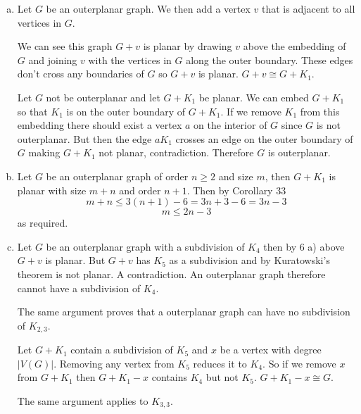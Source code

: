 \begin{enumerate}[(a)]
    \item Let $G$ be an outerplanar graph. We then add a vertex $v$ 
    that is adjacent to all vertices in $G$. 
    
    We can see this graph $G+v$ is planar by drawing $v$
    above the embedding of $G$ and joining $v$ with the vertices in $G$ 
    along the outer boundary. These edges don't cross any boundaries of 
    $G$ so $G+v$ is planar.  $G+v \cong G+K_1$.

    Let $G$ not be outerplanar and let $G+K_1$ be planar. We can embed
    $G+K_1$ so that $K_1$ is on the outer boundary of $G+K_1$.
    If we remove $K_1$ from this embedding there should exist a
    vertex $a$ on the interior of $G$ since $G$ is not outerplanar.
    But then the edge $aK_1$ crosses an edge on the outer boundary
    of $G$ making $G+K_1$ not planar, contradiction. Therefore
    $G$ is outerplanar.

    \item Let $G$ be an outerplanar graph of order $n \ge 2$ and size $m$, 
    then $G+K_1$ is planar with size $m+n$ and order $n+1$. Then
    by Corollary 33 
        $$ m+n \le 3(n+1) - 6 = 3n+3-6 = 3n-3$$
        $$m \le 2n-3$$
        as required.

    \item Let $G$ be an outerplanar graph with a subdivision of $K_4$ then by
    6 a) above $G+v$ is planar. But $G+v$ has $K_5$ as a subdivision 
    and by Kuratowski's theorem is not planar. A contradiction. An
    outerplanar graph therefore cannot have a subdivision of $K_4$. 

    The same argument proves that a outerplanar graph can have no
    subdivision of $K_{2,3}$.

    Let $G+K_1$ contain a subdivision of $K_5$ and $x$ be a vertex
    with degree $|V(G)|$. Removing any vertex
    from $K_5$ reduces it to $K_4$. So if we remove $x$ from $G+K_1$
    then $G+K_1-x$ contains $K_4$ but not $K_5$. $G+K_1-x \cong G$.

    The same argument applies to $K_{3,3}$.
\end{enumerate}
